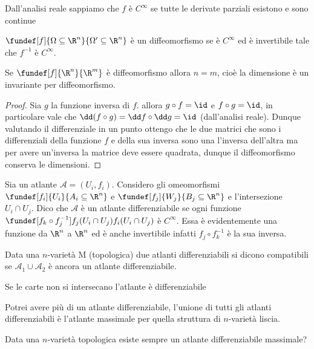 \begin{defn}
Dall'analisi reale sappiamo che $f$ è $C^{\infty}$ se tutte le derivate parziali esistono e sono continue
\end{defn}
\begin{defn}[Diffeomorfismo]
$\fundef[f]{\Omega \subseteq \R^n}{\Omega' \subseteq \R^n}$ è un diffeomorfismo se è $C^\infty$ ed è invertibile tale che $f^{-1}$ è $C^{\infty}$.
\end{defn}
\begin{prop}
Se $\fundef[f]{\R^n}{\R^m}$ è diffeomorfismo allora $n = m$, cioè la dimensione è un invariante per diffeomorfismo.
\end{prop}
\begin{proof}
Sia $g$ la funzione inversa di $f$. allora $g \circ f = \id$ e $f \circ g = \id$, in particolare vale che $\dd(f \circ g) = \dd f \circ \dd g = \id$ (dall'analisi reale). Dunque valutando il differenziale in un punto ottengo che le due matrici che sono i differenziali della funzione $f$ e della sua inversa sono una l'inversa dell'altra ma per avere un'inversa la matrice deve essere quadrata, dunque il diffeomorfismo conserva le dimensioni.
\end{proof}
\begin{defn}
Sia un atlante $\mathcal{A} = {(U_i, f_i)}$. Considero gli omeomorfismi
$\fundef[f_i]{U_i}{A_i \subseteq \R^n }$ e $\fundef[f_j]{W_j}{B_j\subseteq \R^n}$ e l'intersezione 
$U_i \cap U_j$. Dico che $\mathcal{A}$ è un atlante differenziabile se ogni funzione $\fundef[f_k \circ f_j^{-1}]{f_j(U_i \cap U_j)}{f_i(U_i \cap U_j)}$ è $C^{\infty}$. Essa è evidentemente una funzione da $\R^n$ a $\R^n$ ed è anche invertibile infatti $f_j \circ f_k^{-1}$ è la sua inversa.
\end{defn}
\begin{defn} 
Data una $n$-varietà M (topologica) due atlanti differenziabili si dicono compatibili se $\mathcal{A}_1 \cup \mathcal{A}_2$ è ancora un atlante differenziabile.
\end{defn}
\begin{oss}
Se le carte non si intersecano l'atlante è differenziabile
\end{oss}
\begin{oss}
Potrei avere più di un atlante differenziabile, l'unione di tutti gli atlanti differenziabili è l'atlante massimale per quella struttura di $n$-varietà liscia.
\end{oss}
\begin{oss}
Data una $n$-varietà topologica esiste sempre un atlante differenziabile massimale?
\end{oss}